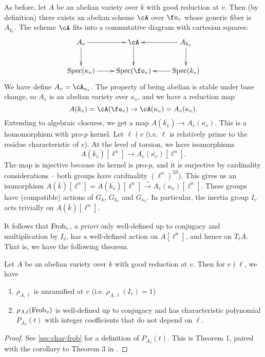 As before, let $A$ be an abelian variety over $k$ with good reduction at $v$. 
Then (by definition) there exists an abelian scheme $\cA$ over $\fo_v$ whose 
generic fiber is $A_{k_v}$. The scheme $\cA$ fits into a commutative diagram 
with cartesian squares: 
\[\xymatrix{
  A_v \ar[r] \ar[d] 
    & \cA \ar[d] 
    & A_{k_v} \ar[l] \ar[d] \\
  \spec(\kappa_v) \ar[r] 
    & \spec(\fo_v) 
    & \spec(k_v) \ar[l] 
}\]
We have define $A_v=\cA_{\kappa_v}$. The property of being abelian is stable 
under base change, so $A_v$ is an abelian variety over $\kappa_v$, and we have 
a reduction map 
\[
  A(k_v) = \cA(\fo_v) \to \cA(\kappa_v) = A_v(\kappa_v) \text{.}
\]
Extending to algebraic closures, we get a map 
$A(\overline{k_v}) \to A_v(\overline{\kappa_v})$. This is a homomorphism with 
pro-$p$ kernel. Let $\ell\nmid v$ (i.e. $\ell$ is relatively prime to the 
residue characteristic of $v$). At the level of torsion, we have isomorphisms 
\[
  A(\overline{k_v})[\ell^n] \to A_v(\overline{\kappa_v})[\ell^n] \text{.}
\]
The map is injective because its kernel is pro-$p$, and it is surjective by 
cardinality considerations -- both groups have cardinality $(\ell^n)^{2 d}$). 
This gives us an isomorphism 
$A(\bar k)[\ell^n] = A(\overline{k_v})[\ell^n]\xrightarrow\sim A_v(\kappa_v)[\ell^n]$. 
These groups have (compatible) actions of $G_k$, $G_{k_v}$ and $G_{\kappa_v}$. In 
particular, the inertia group $I_v$ acts trivially on $A(\bar k)[\ell^n]$. 

It follows that $\mathrm{Frob}_v$, \emph{a priori} only well-defined up to conjugacy 
and multiplication by $I_v$, has a well-defined action on $A[\ell^n]$, and 
hence on $T_\ell A$. That is, we have the following theorem. 

\begin{theorem}\label{thm:ab-var-good}
Let $A$ be an abelian variety over $k$ with good reduction at $v$. Then for 
$v\nmid \ell$, we have  
\begin{enumerate}
  \item $\rho_{A,\ell}$ is unramified at $v$ (i.e. $\rho_{A,\ell}(I_v) = 1$) 
  \item $\rho_{A,\ell}(\mathrm{Frob}_v)$ is well-defined up to conjugacy and has 
    characteristic polynomial $P_{A_v}(t)$ with integer coefficients that do 
    not depend on $\ell$. 
\end{enumerate}
\end{theorem}
\begin{proof}
See \ref{sec:char-frob} for a definition of $P_{A_v}(t)$. This is Theorem 1, 
paired with the corollary to Theorem 3 in \cite{st68}. 
\end{proof}

